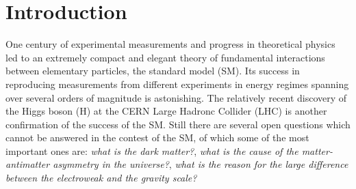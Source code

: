 \documentclass[3p,times,twocolumn]{elsarticle}
\begin{document}

\section{Introduction}
\label{sec:introduction}
One century of experimental measurements and progress in theoretical
physics led to an extremely compact and elegant theory of fundamental
interactions between elementary particles, the standard model (SM). 
Its success in reproducing measurements from different experiments in
energy regimes spanning over several orders of magnitude is
astonishing. The relatively recent discovery of the Higgs boson (H)
at the CERN Large Hadronc Collider (LHC) is another confirmation of
the success of the SM. Still there are several open questions which
cannot be answered in the contest of the SM, of which some of the most
important ones are: {\it what is the dark matter?}, {\it what is the cause of the
matter-antimatter asymmetry in the universe?}, {\it what is the reason for
the large difference between the electroweak and the gravity scale?}
\end{document}
